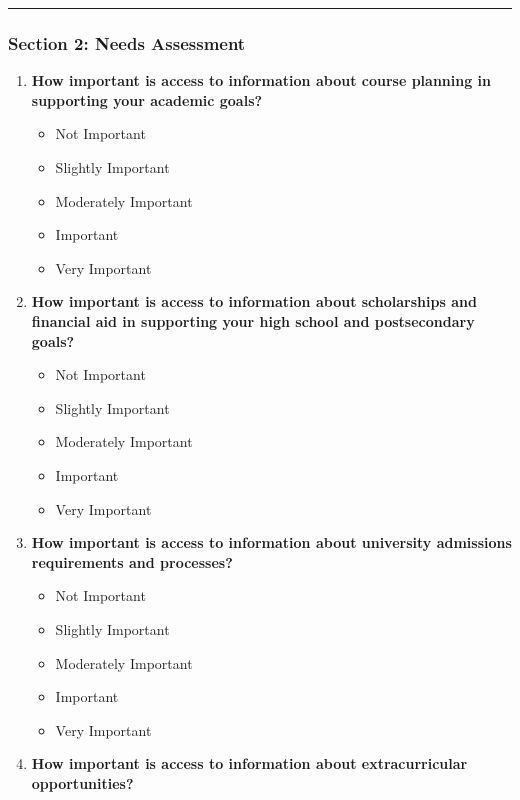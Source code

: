 \documentclass[
  letterpaper,
  DIV=11,
  numbers=noendperiod]{scrartcl}
\providecommand{\tightlist}{%
  \setlength{\itemsep}{0pt}\setlength{\parskip}{0pt}}\usepackage{longtable,booktabs,array}
\begin{document}
\begin{center}\rule{0.5\linewidth}{0.5pt}\end{center}

\subsubsection{Section 2: Needs
Assessment}\label{section-2-needs-assessment}

\begin{enumerate}
\def\labelenumi{\arabic{enumi}.}
\setcounter{enumi}{3}
\tightlist
\item
  \textbf{How important is access to information about course planning
  in supporting your academic goals?}

  \begin{itemize}
  \tightlist
  \item
    Not Important\\
  \item
    Slightly Important\\
  \item
    Moderately Important\\
  \item
    Important\\
  \item
    Very Important
  \end{itemize}
\item
  \textbf{How important is access to information about scholarships and
  financial aid in supporting your high school and postsecondary goals?}

  \begin{itemize}
  \tightlist
  \item
    Not Important\\
  \item
    Slightly Important\\
  \item
    Moderately Important\\
  \item
    Important\\
  \item
    Very Important
  \end{itemize}
\item
  \textbf{How important is access to information about university
  admissions requirements and processes?}

  \begin{itemize}
  \tightlist
  \item
    Not Important\\
  \item
    Slightly Important\\
  \item
    Moderately Important\\
  \item
    Important\\
  \item
    Very Important
  \end{itemize}
\item
  \textbf{How important is access to information about extracurricular
  opportunities?}


\end{enumerate}
\end{document}
